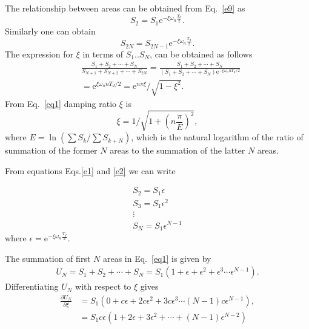 The relationship between areas can be obtained from Eq.~\eqref{e9} as
\begin{equation}
\label{e1}
S_{2}=S_{1} \mathrm{e}^{-\xi \omega_{n} \frac{T_{d}}{2}}.
\end{equation}
Similarly one can obtain
\begin{equation}
\label{e2}
S_{2 N}=S_{2 N-1} \mathrm{e}^{-\xi \omega_{n} \frac{T_{d}}{2}}.
\end{equation}
The expression for $\xi$ in terms of $S_{1}..S_{N}$, can be obtained as follows
\begin{equation}
\label{eq1}
\begin{aligned}
&\frac{S_{1}+S_{2}+\cdots+S_{N}}{S_{N+1}+S_{N+2}+\cdots+S_{2 N}}=\frac{S_{1}+S_{2}+\cdots+S_{N}}{\left(S_{1}+S_{2}+\cdots+S_{N}\right) \mathrm{e}^{-\xi \omega_{n} n T_{d}/2}}\\ &=\mathrm{e}^{\xi \omega_{n} n T_{d}/2}=\mathrm{e}^{ n \pi \xi} / \sqrt{1-\xi^{2}}.
\end{aligned}
\end{equation}
From Eq.~\eqref{eq1} damping ratio $\xi$ is
\begin{equation}
\xi=1 / \sqrt{1+\left(n \frac{\pi}{E}\right)^{2}},
\end{equation}
where $E=\ln \left(\sum S_{k} / \sum S_{k+N}\right)$, which is the natural logarithm of the ratio of summation of the former $N$ areas to the summation of the latter $N$ areas.


From equations Eqs.\eqref{e1} and \eqref{e2} we can write

\begin{equation}
\begin{array}{c}

S_{2}=S_{1}\epsilon\\
S_{3}=S_{1} \epsilon^{2} \\
\vdots \\
S_{N}=S_{1} \epsilon^{N-1}
\end{array}
\end{equation}
where $ \epsilon=\mathrm{e}^{-\xi \omega_{n} \frac{T_{d}}{2}}.$

The summation of first $N$ areas in Eq.~\eqref{eq1} is given by
\begin{equation}
\begin{aligned}
U_N=S_{1}+S_{2}+\cdots+S_{N}=S_1 (1+\epsilon+\epsilon^2+\epsilon^3\cdots\epsilon^{N-1}).
\end{aligned}
\end{equation}
Differentiating $U_N$ with respect to $\xi$ gives
\begin{align}
\frac{\partial U_N}{\partial \xi}&=S_{1}(0+c\epsilon+2c\epsilon^2+3c\epsilon^3\cdots(N-1)c\epsilon^{N-1}), \nonumber\\
                                 &=S_{1}c\epsilon(1+2\epsilon+3\epsilon^2+\cdots+(N-1)\epsilon^{N-2})  
\label{e3}
\end{align}

